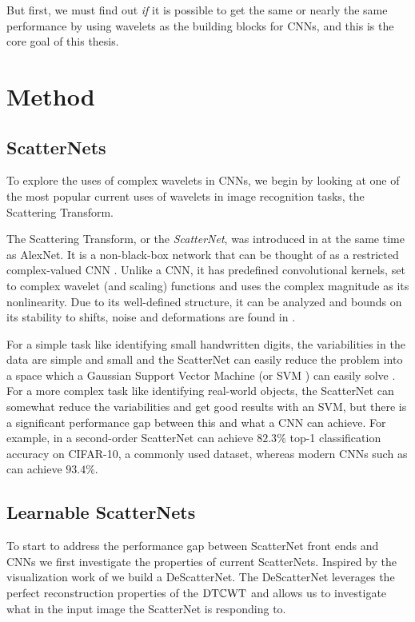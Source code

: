 But first, we must find out \emph{if} it is possible to get the same or nearly the same
performance by using wavelets as the building blocks for CNNs, and this is the
core goal of this thesis. 

\section{Method}
\subsection{ScatterNets}
To explore the uses of complex wavelets in CNNs, we begin by looking at one of the most
popular current uses of wavelets in image recognition tasks, the
Scattering Transform. 

The Scattering Transform, or the \emph{ScatterNet}, was introduced in \cite{mallat_group_2012,
bruna_invariant_2013} at the same time as AlexNet. It is a non-black-box
network that can be thought of as a restricted complex-valued CNN
\cite{bruna_mathematical_2015}. Unlike a CNN, it has predefined
convolutional kernels, set to complex wavelet (and scaling) functions and uses
the complex magnitude as its nonlinearity. Due to
its well-defined structure, it can be analyzed and bounds on its stability to 
shifts, noise and deformations are found in \cite{mallat_group_2012}.
%

For a simple task like identifying small handwritten digits,
the variabilities in the data are simple and small and the ScatterNet can easily
reduce the problem into a space which a Gaussian Support Vector Machine (or SVM
\cite{cortes_support-vector_1995}) can easily solve
\cite{bruna_invariant_2013}. For a more complex task like identifying real-world
objects, the ScatterNet can somewhat reduce the variabilities and get good
results with an SVM, but there is a significant performance gap between this and
what a CNN can achieve. For example, in \cite{oyallon_deep_2015} a second-order
ScatterNet can achieve $82.3\%$ top-1 classification accuracy on CIFAR-10, a
commonly used dataset, whereas modern CNNs such as \cite{he_deep_2016} can
achieve $93.4\%$. 

\subsection{Learnable ScatterNets}
To start to address the performance gap between ScatterNet front ends and CNNs
we first investigate the properties of current ScatterNets. Inspired by the
visualization work of \citeauthor{zeiler_visualizing_2014}
\cite{zeiler_visualizing_2014} we build a DeScatterNet. The DeScatterNet
leverages the perfect reconstruction properties of the $\mathrm{DT}\mathbb{C}\mathrm{WT}$ and allows us to
investigate what in the input image the ScatterNet is responding to. 

